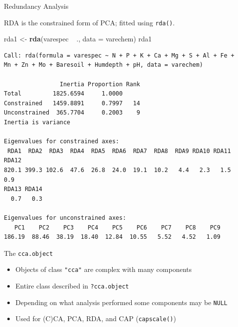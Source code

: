 \documentclass[10pt,ignorenonframetext,compress, aspectratio=169]{beamer}
\newenvironment{Shaded}{\begin{snugshade}}{\end{snugshade}}
\newcommand{\KeywordTok}[1]{\textcolor[rgb]{0.13,0.29,0.53}{\textbf{{#1}}}}
\newcommand{\DataTypeTok}[1]{\textcolor[rgb]{0.13,0.29,0.53}{{#1}}}
\newcommand{\StringTok}[1]{\textcolor[rgb]{0.31,0.60,0.02}{{#1}}}
\newcommand{\NormalTok}[1]{{#1}}
\providecommand{\tightlist}{%
  \setlength{\itemsep}{0pt}\setlength{\parskip}{0pt}}
\begin{document}
\begin{frame}[fragile]{Redundancy Analysis}

RDA is the constrained form of PCA; fitted using \texttt{rda()}.

\tiny

\begin{Shaded}
\begin{Highlighting}[]
\NormalTok{rda1 <-}\StringTok{ }\KeywordTok{rda}\NormalTok{(varespec ~}\StringTok{ }\NormalTok{., }\DataTypeTok{data =} \NormalTok{varechem)}
\NormalTok{rda1}
\end{Highlighting}
\end{Shaded}

\begin{verbatim}
Call: rda(formula = varespec ~ N + P + K + Ca + Mg + S + Al + Fe +
Mn + Zn + Mo + Baresoil + Humdepth + pH, data = varechem)

                Inertia Proportion Rank
Total         1825.6594     1.0000     
Constrained   1459.8891     0.7997   14
Unconstrained  365.7704     0.2003    9
Inertia is variance 

Eigenvalues for constrained axes:
 RDA1  RDA2  RDA3  RDA4  RDA5  RDA6  RDA7  RDA8  RDA9 RDA10 RDA11 RDA12 
820.1 399.3 102.6  47.6  26.8  24.0  19.1  10.2   4.4   2.3   1.5   0.9 
RDA13 RDA14 
  0.7   0.3 

Eigenvalues for unconstrained axes:
   PC1    PC2    PC3    PC4    PC5    PC6    PC7    PC8    PC9 
186.19  88.46  38.19  18.40  12.84  10.55   5.52   4.52   1.09 
\end{verbatim}

\normalsize

\end{frame}

\begin{frame}[fragile]{The \texttt{cca.object}}

\begin{itemize}
\tightlist
\item
  Objects of class \texttt{"cca"} are complex with many components
\item
  Entire class described in \texttt{?cca.object}
\item
  Depending on what analysis performed some components may be
  \texttt{NULL}
\item
  Used for (C)CA, PCA, RDA, and CAP (\texttt{capscale()})
\end{itemize}

\end{frame}
\end{document}
